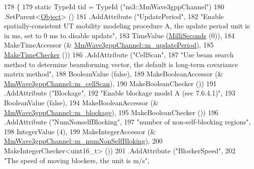 \begin{DoxyCode}
178 \{
179         \textcolor{keyword}{static} TypeId tid = TypeId (\textcolor{stringliteral}{"ns3::MmWave3gppChannel"})
180         .SetParent<\hyperlink{classns3_1_1Object_a40860402e64d8008fb42329df7097cdb}{Object}> ()
181         .AddAttribute (\textcolor{stringliteral}{"UpdatePeriod"},
182                                 \textcolor{stringliteral}{"Enable spatially-consistent UT mobility modeling procedure A, the update
       period unit is in ms, set to 0 ms to disable update"},
183                                 TimeValue (\hyperlink{group__timecivil_gaf26127cf4571146b83a92ee18679c7a9}{MilliSeconds} (0)),
184                                 MakeTimeAccessor (&
      \hyperlink{classns3_1_1MmWave3gppChannel_a2844f8c7e7373cb777384eaf0e8a7b11}{MmWave3gppChannel::m\_updatePeriod}),
185                                 \hyperlink{group__time_ga7032965bd4afa578691d88c09e4481c1}{MakeTimeChecker} ())
186         .AddAttribute (\textcolor{stringliteral}{"CellScan"},
187                                 \textcolor{stringliteral}{"Use beam search method to determine beamforming vector, the default is
       long-term covariance matrix method"},
188                                 BooleanValue (\textcolor{keyword}{false}),
189                                 MakeBooleanAccessor (&
      \hyperlink{classns3_1_1MmWave3gppChannel_ac973f52321b6843ce42f036620af63e8}{MmWave3gppChannel::m\_cellScan}),
190                                 MakeBooleanChecker ())
191         .AddAttribute (\textcolor{stringliteral}{"Blockage"},
192                                 \textcolor{stringliteral}{"Enable blockage model A (sec 7.6.4.1)"},
193                                 BooleanValue (\textcolor{keyword}{false}),
194                                 MakeBooleanAccessor (&
      \hyperlink{classns3_1_1MmWave3gppChannel_a5f19d0ed379e7db9448f4f668e0c7927}{MmWave3gppChannel::m\_blockage}),
195                                 MakeBooleanChecker ())
196         .AddAttribute (\textcolor{stringliteral}{"NumNonselfBlocking"},
197                                 \textcolor{stringliteral}{"number of non-self-blocking regions"},
198                                 IntegerValue (4),
199                                 MakeIntegerAccessor (&
      \hyperlink{classns3_1_1MmWave3gppChannel_addfe5e6c9d8e2531fe165ff86461d2d3}{MmWave3gppChannel::m\_numNonSelfBloking}),
200                                 MakeIntegerChecker<uint16\_t> ())
201         .AddAttribute (\textcolor{stringliteral}{"BlockerSpeed"},
202                                 \textcolor{stringliteral}{"The speed of moving blockers, the unit is m/s"},

\end{DoxyCode}
